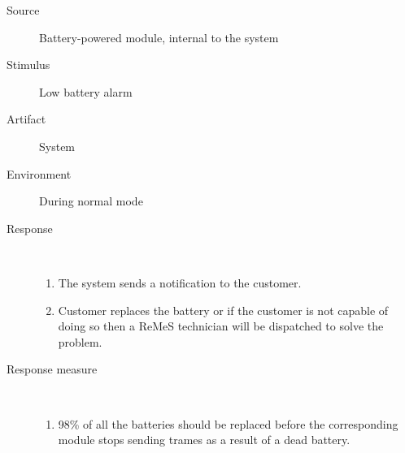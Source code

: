 \begin{description}
	\item[Source] Battery-powered module, internal to the system
	\item[Stimulus] Low battery alarm
	\item[Artifact] System
	\item[Environment] During normal mode 
	\item[Response] \
	\begin{enumerate}
	  \item The system sends a notification to the customer.
	  \item Customer replaces the battery or if the customer is not capable of
	  doing so then a ReMeS technician will be dispatched to solve the problem.
	\end{enumerate}
	\item[Response measure] \
	\begin{enumerate}
	  \item 98\% of all the batteries should be replaced before the corresponding
	  module stops sending trames as a result of a dead battery.
	\end{enumerate}
\end{description}